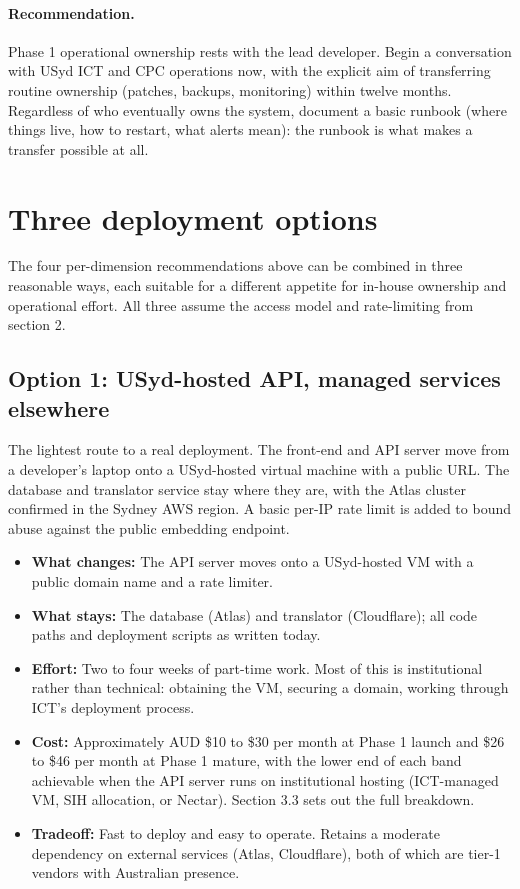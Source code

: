\documentclass[11pt,a4paper]{article}
\begin{document}
\paragraph{Recommendation.} Phase 1 operational ownership rests with the lead developer. Begin a conversation with USyd ICT and CPC operations now, with the explicit aim of transferring routine ownership (patches, backups, monitoring) within twelve months. Regardless of who eventually owns the system, document a basic runbook (where things live, how to restart, what alerts mean): the runbook is what makes a transfer possible at all.

\section{Three deployment options}

The four per-dimension recommendations above can be combined in three reasonable ways, each suitable for a different appetite for in-house ownership and operational effort. All three assume the access model and rate-limiting from section 2.

\subsection{Option 1: USyd-hosted API, managed services elsewhere}

The lightest route to a real deployment. The front-end and API server move from a developer's laptop onto a USyd-hosted virtual machine with a public URL. The database and translator service stay where they are, with the Atlas cluster confirmed in the Sydney AWS region. A basic per-IP rate limit is added to bound abuse against the public embedding endpoint.

\begin{itemize}[leftmargin=1.5em,itemsep=2pt]
  \item \textbf{What changes:} The API server moves onto a USyd-hosted VM with a public domain name and a rate limiter.
  \item \textbf{What stays:} The database (Atlas) and translator (Cloudflare); all code paths and deployment scripts as written today.
  \item \textbf{Effort:} Two to four weeks of part-time work. Most of this is institutional rather than technical: obtaining the VM, securing a domain, working through ICT's deployment process.
  \item \textbf{Cost:} Approximately AUD \$10 to \$30 per month at Phase 1 launch and \$26 to \$46 per month at Phase 1 mature, with the lower end of each band achievable when the API server runs on institutional hosting (ICT-managed VM, SIH allocation, or Nectar). Section 3.3 sets out the full breakdown.
  \item \textbf{Tradeoff:} Fast to deploy and easy to operate. Retains a moderate dependency on external services (Atlas, Cloudflare), both of which are tier-1 vendors with Australian presence.
\end{itemize}
\end{document}
